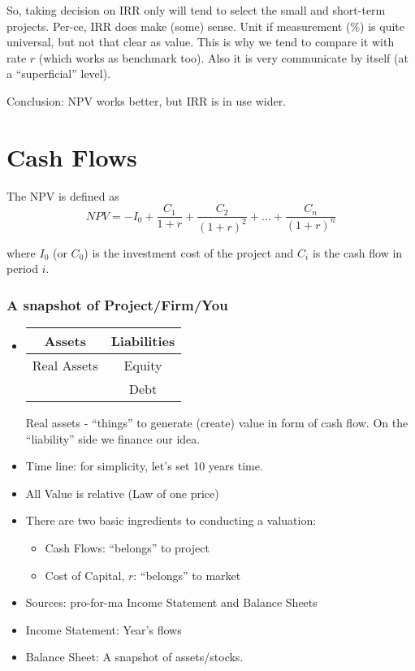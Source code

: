 \documentclass{scrartcl}
\begin{document}
So, taking decision on IRR only will tend to select the small and short-term projects.
Per-ce, IRR does make (some) sense. Unit if measurement (\%) is quite universal,
but not that clear as value. This is why we tend to compare it with rate $r$
(which works as benchmark too). Also it is very communicate by itself (at a
``superficial'' level). 

Conclusion: NPV works better, but IRR is in use wider. 

\section{Cash Flows}
\label{sec:Cashflow}

The NPV is defined as $$NPV = -I_0 + \frac{C_1}{1+r} + \frac{C_2}{(1+r)^2} +
\dots + \frac{C_n}{(1+r)^n}$$

where $I_0$ (or $C_0$) is the investment cost of the project and $C_i$ is the
cash flow in period $i$.

\subsubsection*{A snapshot of Project/Firm/You}
\begin{itemize}


\item  \begin{tabular}{|c|c|}
\hline
  Assets & Liabilities \\
  \hline
  Real Assets &  Equity \\
& Debt \\
\hline 
\end{tabular}
Real assets - ``things'' to generate (create) value in form of cash flow. On the
``liability'' side we finance our idea.

\item Time line: for simplicity, let's set 10 years time. 
\item All Value is relative (Law of one price)
\item There are two basic ingredients to conducting a valuation:
  \begin{itemize}
  \item Cash Flows: ``belongs'' to project
  \item Cost of Capital, $r$: ``belongs'' to market 
  \end{itemize}

\item Sources: pro-for-ma Income Statement and Balance Sheets
\item Income Statement: Year's flows
\item Balance Sheet: A snapshot of assets/stocks.
\end{itemize}
\end{document}
